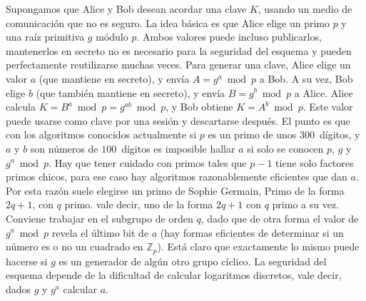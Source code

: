   Supongamos que \foreignlanguage{english}{Alice}%
  y \foreignlanguage{english}{Bob}%
  desean acordar una clave \(K\),
  usando un medio de comunicación que no es seguro.
  La idea básica
  es que \foreignlanguage{english}{Alice} elige un primo \(p\)
  y una raíz primitiva \(g\) módulo \(p\).%
  Ambos valores puede incluso publicarlos,
  mantenerlos en secreto
  no es necesario para la seguridad del esquema
  y pueden perfectamente reutilizarse muchas veces.
  Para generar una clave,
  \foreignlanguage{english}{Alice} elige un valor \(a\)
  (que mantiene en secreto),
  y envía \(A = g^a \bmod p\) a \foreignlanguage{english}{Bob}.
  A su vez,
  \foreignlanguage{english}{Bob} elige \(b\)
  (que también mantiene en secreto),
  y envía  \(B = g^b \bmod p\) a \foreignlanguage{english}{Alice}.
  \foreignlanguage{english}{Alice}
  calcula \(K = B^a \bmod p = g^{a b} \bmod p\),
  y \foreignlanguage{english}{Bob} obtiene \(K = A^b \bmod p\).
  Este valor puede usarse como clave por una sesión%
  y descartarse después.
  El punto es que con los algoritmos conocidos actualmente
  si \(p\) es un primo de unos \(300\)~dígitos,
  y \(a\) y \(b\) son números de \(100\)~dígitos
  es imposible hallar \(a\)
  si solo se conocen \(p\), \(g\) y \(g^a \bmod p\).
  Hay que tener cuidado con primos
  tales que \(p - 1\) tiene solo factores primos chicos,
  para ese caso hay algoritmos razonablemente eficientes
  que dan \(a\).
  Por esta razón suele elegirse un primo de Sophie Germain,%
	     {Primo de la forma \(2 q + 1\), con \(q\) primo.}%
  vale decir,
  uno de la forma \(2 q + 1\) con \(q\) primo a su vez.
  Conviene trabajar en el subgrupo de orden \(q\),
  dado que de otra forma el valor de \(g^a \bmod p\)
  revela el último bit de \(a\)
  (hay formas eficientes de determinar
   si un número es o no un cuadrado
   en \(\mathbb{Z}_p\)).
  Está claro que exactamente lo mismo puede hacerse
  si \(g\) es un generador de algún otro grupo cíclico.
  La seguridad del esquema
  depende de la dificultad de calcular logaritmos discretos,%
  vale decir,
  dados \(g\) y \(g^a\) calcular \(a\).

